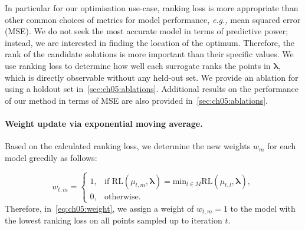 In particular for our optimisation use-case, ranking loss is more appropriate than other common choices of metrics for model performance, \emph{e.g.,} mean squared error (MSE). 
We do not seek the most accurate model in terms of predictive power; instead, we are interested in finding the location of the optimum. 
Therefore, the rank of the candidate solutions is more important than their specific values. 
We use ranking loss to determine how well each surrogate ranks the points in $\boldsymbol{\lambda}$, which is directly observable without any held-out set. 
We provide an ablation for using a holdout set in~\cref{sec:ch05:ablations}.
Additional results on the performance of our method in terms of MSE are also provided in~\cref{sec:ch05:ablations}.

\paragraph{Weight update via exponential moving average.}
Based on the calculated ranking loss, we determine the new weights 
${w}_m$ 
for each model greedily as follows:

\begin{equation}\label{eq:ch05:weight}
    {w}_{t,m} =
    \begin{cases}
        1, & \text{if } \text{RL}(\mu_{t,m}, \boldsymbol{\lambda}) = \text{min}_{l \in M} \text{RL}(\mu_{t,l}, \boldsymbol{\lambda}), \\
        0, & \text{otherwise}.
    \end{cases}
\end{equation}
%
Therefore, in~\cref{eq:ch05:weight}, 
we assign a weight of ${w}_{t,m} = 1$ to the model
with the lowest ranking loss on all points sampled up to iteration $t$.

